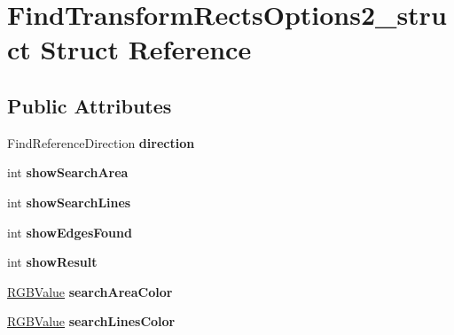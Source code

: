 \hypertarget{structFindTransformRectsOptions2__struct}{
\section{FindTransformRectsOptions2\_\-struct Struct Reference}
\label{structFindTransformRectsOptions2__struct}
}
\subsection*{Public Attributes}
\begin{DoxyCompactItemize}
\item 
\hypertarget{structFindTransformRectsOptions2__struct_a6b7528a7c3980b01c198de84c7189008}{
FindReferenceDirection {\bfseries direction}}
\label{structFindTransformRectsOptions2__struct_a6b7528a7c3980b01c198de84c7189008}

\item 
\hypertarget{structFindTransformRectsOptions2__struct_ad936327929f35c7e86f2be5abedf6c7b}{
int {\bfseries showSearchArea}}
\label{structFindTransformRectsOptions2__struct_ad936327929f35c7e86f2be5abedf6c7b}

\item 
\hypertarget{structFindTransformRectsOptions2__struct_a73306ce298215f0f5d606fe666f371ac}{
int {\bfseries showSearchLines}}
\label{structFindTransformRectsOptions2__struct_a73306ce298215f0f5d606fe666f371ac}

\item 
\hypertarget{structFindTransformRectsOptions2__struct_a8f0731151268e0ab5bebefea80d4ee11}{
int {\bfseries showEdgesFound}}
\label{structFindTransformRectsOptions2__struct_a8f0731151268e0ab5bebefea80d4ee11}

\item 
\hypertarget{structFindTransformRectsOptions2__struct_abfec0e154350c4402d4a147cc105047c}{
int {\bfseries showResult}}
\label{structFindTransformRectsOptions2__struct_abfec0e154350c4402d4a147cc105047c}

\item 
\hypertarget{structFindTransformRectsOptions2__struct_a2fa49d85a37d4e3cfcfa65e3fabb8d04}{
\hyperlink{structRGBValue__struct}{RGBValue} {\bfseries searchAreaColor}}
\label{structFindTransformRectsOptions2__struct_a2fa49d85a37d4e3cfcfa65e3fabb8d04}

\item 
\hypertarget{structFindTransformRectsOptions2__struct_ac841a88a911fb315adb13a9279019a3a}{
\hyperlink{structRGBValue__struct}{RGBValue} {\bfseries searchLinesColor}}
\label{structFindTransformRectsOptions2__struct_ac841a88a911fb315adb13a9279019a3a}


\end{DoxyCompactItemize}
